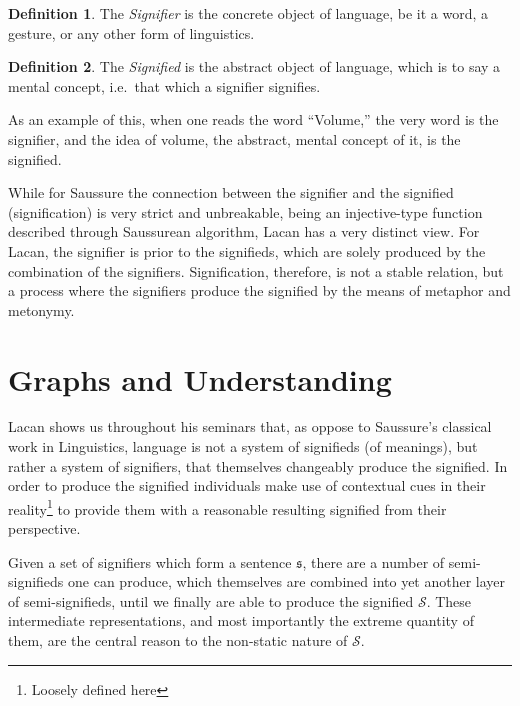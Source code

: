 \documentclass[11pt,letterpaper]{article}
\theoremstyle{definition}
\newtheorem{defn}{Definition}[section]
\begin{document}
\begin{defn}\label{def:signifier}
	The \emph{Signifier} is the concrete object of language, be it a word, a gesture, or any other form of linguistics.\autocite{berger_2013}
\end{defn}
\begin{defn}\label{def:signified}
	The \emph{Signified} is the abstract object of language, which is to say a mental concept, i.e.\ that which a signifier signifies.\autocite{berger_2013}
\end{defn}
As an example of this, when one reads the word ``Volume,'' the very word is the signifier, and the idea of volume, the abstract, mental concept of it, is the signified.

While for Saussure the connection between the signifier and the signified (signification) is very strict and unbreakable, being an injective-type function described through Saussurean algorithm, Lacan has a very distinct view. For Lacan, the signifier is prior to the signifieds, which are solely produced by the combination of the signifiers. Signification, therefore, is not a stable relation, but a process where the signifiers produce the signified by the means of metaphor and metonymy.\autocite{lacan_miller_2000}

\newpage
\section{Graphs and Understanding}

Lacan shows us throughout his seminars that, as oppose to Saussure's classical work in Linguistics, language is not a system of signifieds (of meanings), but rather a system of signifiers, that themselves changeably produce the signified. In order to produce the signified individuals make use of contextual cues in their reality\footnote{Loosely defined here} to provide them with a reasonable resulting signified from their perspective.

Given a set of signifiers which form a sentence \(\mathfrak{s}\), there are a number of semi-signifieds one can produce, which themselves are combined into yet another layer of semi-signifieds, until we finally are able to produce the signified \(\mathscr{S}\). These intermediate representations, and most importantly the extreme quantity of them, are the central reason to the non-static nature of \(\mathscr{S}\).
\end{document}
